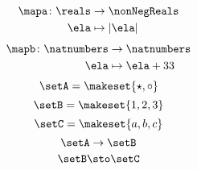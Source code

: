 \begin{forslides}
    \begin{equation}
        \label{eq:quiz_inj_1}
        \begin{aligned}
            \mapa\colon \reals & \to \nonNegReals \\
            \ela               & \mapsto \vert \ela \vert
        \end{aligned}
    \end{equation}
    \begin{equation}
        \label{eq:quiz_inj_2}
        \begin{aligned}
            \mapb\colon \natnumbers & \to \natnumbers \\
            \ela                    & \mapsto \ela + 33
        \end{aligned}
    \end{equation}
    \begin{equation}
        \label{eq:quiz_isos_1}
        \setA=\makeset{\star, \circ}
    \end{equation}
    \begin{equation}
        \label{eq:quiz_isos_2}
        \setB=\makeset{1, 2, 3}
    \end{equation}
    \begin{equation}
        \label{eq:quiz_isos_3}
        \setC=\makeset{a, b, c}
    \end{equation}
    \begin{equation}
        \label{eq:quiz_isos_4}
        \setA\to \setB
    \end{equation}
    \begin{equation}
        \label{eq:quiz_isos_5}
        \setB \sto \setC
    \end{equation}
\end{forslides}

